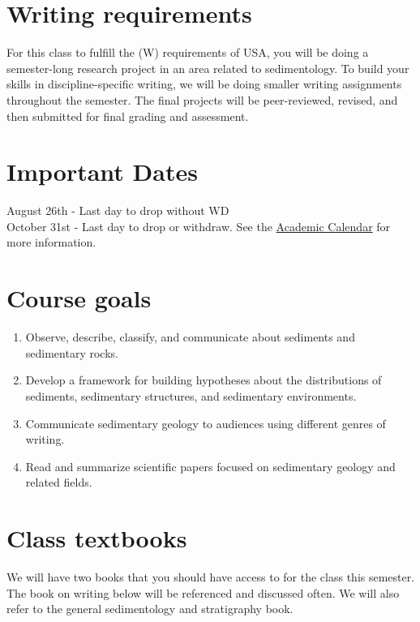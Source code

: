 \documentclass[11pt,]{article}
\begin{document}
\section{Writing requirements}\label{writing-requirements}

For this class to fulfill the (W) requirements of USA, you will be doing
a semester-long research project in an area related to sedimentology. To
build your skills in discipline-specific writing, we will be doing
smaller writing assignments throughout the semester. The final projects
will be peer-reviewed, revised, and then submitted for final grading and
assessment.

\section{Important Dates}\label{important-dates}

August 26th - Last day to drop without WD\\
October 31st - Last day to drop or withdraw. See the
\href{https://www.southalabama.edu/academiccalendar/}{Academic Calendar}
for more information.\\

\newpage

\section{Course goals}\label{course-goals}

\begin{enumerate}
\def\labelenumi{\arabic{enumi}.}
\item
  Observe, describe, classify, and communicate about sediments and
  sedimentary rocks.
\item
  Develop a framework for building hypotheses about the distributions of
  sediments, sedimentary structures, and sedimentary environments.
\item
  Communicate sedimentary geology to audiences using different genres of
  writing.
\item
  Read and summarize scientific papers focused on sedimentary geology
  and related fields.
\end{enumerate}

\section{Class textbooks}\label{class-textbooks}

We will have two books that you should have access to for the class this
semester. The book on writing below will be referenced and discussed
often. We will also refer to the general sedimentology and stratigraphy
book.
\end{document}
